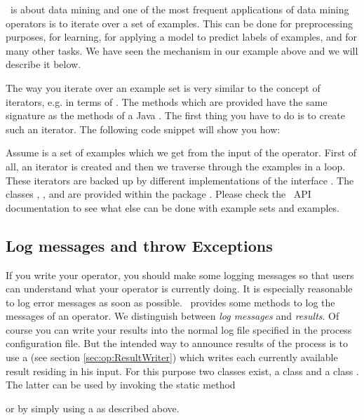 \rapidminer\ is about data mining and one of the most frequent applications
of data mining operators is to iterate over a set of examples. This
can be done for preprocessing purposes, for learning, for applying a
model to predict labels of examples, and for many other tasks. We have seen
the mechanism in our example above and we will describe it below.

The way you iterate over an example set is very similar to the concept
of iterators, e.g. in terms of . The methods which are provided
have the same signature as the methods of a Java . The first
thing you have to do is to create such an iterator. The following code 
snippet will show you how:


Assume  is a set of examples which we get from the input
of the operator. First of all, an iterator is created and then we traverse
through the examples in a loop. These iterators are backed up by different
implementations of the interface . The
classes ,
, and
 are provided within the package
. Please check the \rapidminer\ API documentation to
see what else can be done with example sets and examples.



\subsection{Log messages and throw Exceptions}
\label{sec:op:logservice}

If you write your operator, you should make some logging messages
so that users can understand what your
operator is currently doing. It is especially reasonable to log error messages as
soon as possible. \rapidminer\ provides some methods to log the messages of
an operator. We distinguish between {\em log messages} and {\em
results}. Of course you can write your results into the
normal log file specified in the process configuration file. But
the intended way to announce results of the process is to use a
 (see section
\ref{sec:op:ResultWriter}) which writes each
currently available result residing in his input. For this purpose two classes
exist, a class  and a class
. The latter
can be used by invoking the static method 
\begin{center}
\end{center}
or by simply using a  as described above.

